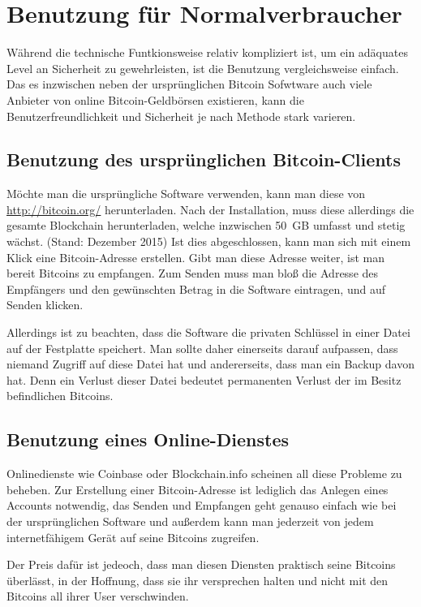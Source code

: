 \section{Benutzung für Normalverbraucher}

Während die technische Funtkionsweise relativ kompliziert ist, um ein adäquates Level an Sicherheit zu gewehrleisten, ist die Benutzung vergleichsweise einfach.
Das es inzwischen neben der ursprünglichen Bitcoin Sofwtware auch viele Anbieter von online Bitcoin-Geldbörsen existieren, kann die Benutzerfreundlichkeit und Sicherheit je nach Methode stark varieren.

\subsection{Benutzung des ursprünglichen Bitcoin-Clients}

Möchte man die ursprüngliche Software verwenden, kann man diese von \url{http://bitcoin.org/} herunterladen.
Nach der Installation, muss diese allerdings die gesamte Blockchain herunterladen, welche inzwischen 50~GB umfasst und stetig wächst. (Stand: Dezember 2015)
Ist dies abgeschlossen, kann man sich mit einem Klick eine Bitcoin-Adresse erstellen.
Gibt man diese Adresse weiter, ist man bereit Bitcoins zu empfangen.
Zum Senden muss man bloß die Adresse des Empfängers und den gewünschten Betrag in die Software eintragen, und auf Senden klicken.

Allerdings ist zu beachten, dass die Software die privaten Schlüssel in einer Datei auf der Festplatte speichert.
Man sollte daher einerseits darauf aufpassen, dass niemand Zugriff auf diese Datei hat und andererseits, dass man ein Backup davon hat.
Denn ein Verlust dieser Datei bedeutet permanenten Verlust der im Besitz befindlichen Bitcoins.

\subsection{Benutzung eines Online-Dienstes}

Onlinedienste wie Coinbase oder Blockchain.info scheinen all diese Probleme zu beheben.
Zur Erstellung einer Bitcoin-Adresse ist lediglich das Anlegen eines Accounts notwendig, das Senden und Empfangen geht genauso einfach wie bei der ursprünglichen Software und außerdem kann man jederzeit von jedem internetfähigem Gerät auf seine Bitcoins zugreifen.

Der Preis dafür ist jedeoch, dass man diesen Diensten praktisch seine Bitcoins überlässt, in der Hoffnung, dass sie ihr versprechen halten und nicht mit den Bitcoins all ihrer User verschwinden.
